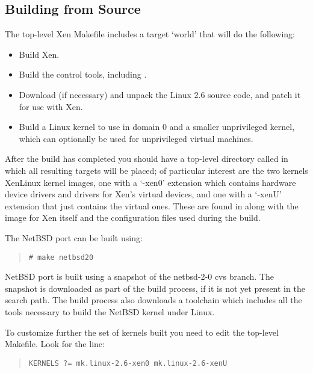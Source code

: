 \subsection{Building from Source}

The top-level Xen Makefile includes a target `world' that will do the
following:

\begin{itemize}
\item Build Xen.
\item Build the control tools, including \xend.
\item Download (if necessary) and unpack the Linux 2.6 source code,
  and patch it for use with Xen.
\item Build a Linux kernel to use in domain 0 and a smaller
  unprivileged kernel, which can optionally be used for unprivileged
  virtual machines.
\end{itemize}

After the build has completed you should have a top-level directory
called  in which all resulting targets will be placed; of
particular interest are the two kernels XenLinux kernel images, one
with a `-xen0' extension which contains hardware device drivers and
drivers for Xen's virtual devices, and one with a `-xenU' extension
that just contains the virtual ones. These are found in
 along with the image for Xen itself and the
configuration files used during the build.

The NetBSD port can be built using:
\begin{quote}
\begin{verbatim}
# make netbsd20
\end{verbatim}
\end{quote}
NetBSD port is built using a snapshot of the netbsd-2-0 cvs branch.
The snapshot is downloaded as part of the build process, if it is not
yet present in the  search path.  The build
process also downloads a toolchain which includes all the tools
necessary to build the NetBSD kernel under Linux.

To customize further the set of kernels built you need to edit the
top-level Makefile. Look for the line:

\begin{quote}
\begin{verbatim}
KERNELS ?= mk.linux-2.6-xen0 mk.linux-2.6-xenU
\end{verbatim}
\end{quote}

